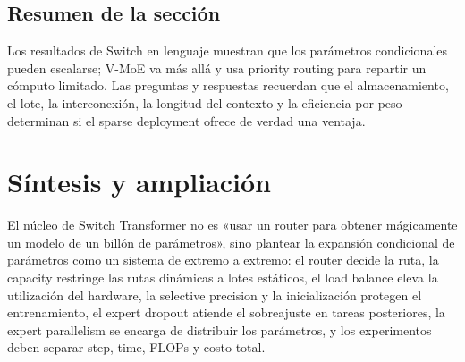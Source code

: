 \documentclass[a4paper]{article}
\begin{document}
\subsection{Resumen de la sección}

Los resultados de Switch en lenguaje muestran que los parámetros condicionales pueden escalarse; V-MoE va más allá y usa priority routing para repartir un cómputo limitado. Las preguntas y respuestas recuerdan que el almacenamiento, el lote, la interconexión, la longitud del contexto y la eficiencia por peso determinan si el sparse deployment ofrece de verdad una ventaja.
\section{Síntesis y ampliación}

El núcleo de Switch Transformer no es «usar un router para obtener mágicamente un modelo de un billón de parámetros», sino plantear la expansión condicional de parámetros como un sistema de extremo a extremo: el router decide la ruta, la capacity restringe las rutas dinámicas a lotes estáticos, el load balance eleva la utilización del hardware, la selective precision y la inicialización protegen el entrenamiento, el expert dropout atiende el sobreajuste en tareas posteriores, la expert parallelism se encarga de distribuir los parámetros, y los experimentos deben separar step, time, FLOPs y costo total.
\end{document}
